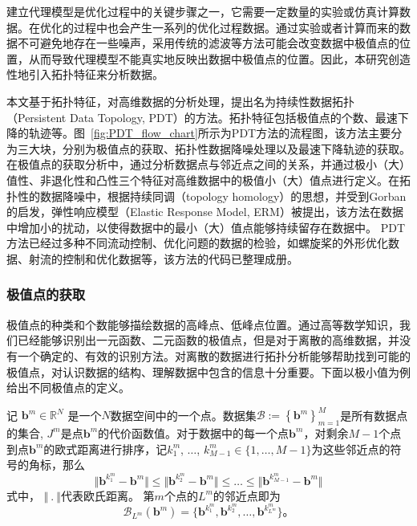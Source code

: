建立代理模型是优化过程中的关键步骤之一，它需要一定数量的实验或仿真计算数据。在优化的过程中也会产生一系列的优化过程数据。通过实验或者计算而来的数据不可避免地存在一些噪声，采用传统的滤波等方法可能会改变数据中极值点的位置，从而导致代理模型不能真实地反映出数据中极值点的位置。因此，本研究创造性地引入拓扑特征来分析数据。

本文基于拓扑特征，对高维数据的分析处理，提出名为持续性数据拓扑（Persistent Data Topology, PDT）的方法。拓扑特征包括极值点的个数、最速下降的轨迹等。图~\ref{fig:PDT_flow_chart}所示为PDT方法的流程图，该方法主要分为三大块，分别为极值点的获取、拓扑性数据降噪处理以及最速下降轨迹的获取。
在极值点的获取分析中，通过分析数据点与邻近点之间的关系，并通过极小（大）值性、非退化性和凸性三个特征对高维数据中的极值小（大）值点进行定义。在拓扑性的数据降噪中，根据持续同调（topology homology）的思想，并受到Gorban\cite{Gorban2008}的启发，弹性响应模型（Elastic Response Model, ERM）被提出，该方法在数据中增加小的扰动，以使得数据中的最小（大）值点能够持续留存在数据中。
PDT方法已经过多种不同流动控制、优化问题的数据的检验，如螺旋桨的外形优化数据\cite{WangTY2023}、射流的控制和优化\cite{Noack2023arxiv}数据等，该方法的代码已整理成册\cite{WangTY2023xPDT}。



\vspace{0.8em}
\subsubsection{极值点的获取}\label{extrema extraction}
\vspace{0.8em}

极值点的种类和个数能够描绘数据的高峰点、低峰点位置。通过高等数学知识，我们已经能够识别出一元函数、二元函数的极值点，但是对于离散的高维数据，并没有一个确定的、有效的识别方法。对离散的数据进行拓扑分析能够帮助找到可能的极值点，对认识数据的结构、理解数据中包含的信息十分重要。下面以极小值为例给出不同极值点的定义。

记 $\bm{b}^m \in \mathbb{R}^N$ 是一个$N$数据空间中的一个点。数据集$\mathcal{B} := \left \{ \bm{b}^m\right \}_{m=1}^{M} $是所有数据点的集合, $J^m$是点$\bm{b}^m$的代价函数值。对于数据中的每一个点$\bm{b}^m$，对剩余$M-1$个点到点$\bm{b}^m$的欧式距离进行排序，记$k^m_1$, $\ldots$, $k^m_{M-1} \in \{1, \ldots, M-1\}$为这些邻近点的符号的角标，那么
\begin{equation}
\label{Eqn:Neighborhood}
    \Vert \bm{b}^{k^m_1} - \bm{b}^m \Vert \leq \Vert  \bm{b}^{k^m_2} - \bm{b}^m \Vert  \leq \ldots \leq \Vert  \bm{b}^{k^m_{M-1}} - \bm{b}^m \Vert 
\end{equation}
式中， $\Vert \> . \> \Vert$代表欧氏距离。
第$m$个点的$L^m$的邻近点即为$$\mathcal{B}_{L^m}(\bm{b}^m)= \{\bm{b}^{k^m_1}, \bm{b}^{k^m_2}, \ldots, \bm{b}^{k^m_{L^m}}\}。$$

